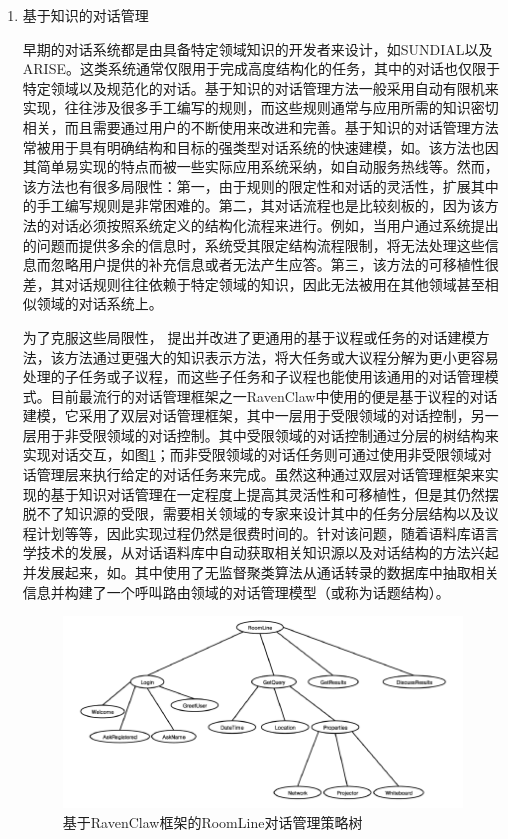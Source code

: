 \begin{enumerate}

\item 基于知识的对话管理

早期的对话系统都是由具备特定领域知识的开发者来设计，如SUNDIAL\cite{Peckham1993}以及ARISE\cite{Lamel1999}。这类系统通常仅限用于完成高度结构化的任务，其中的对话也仅限于特定领域以及规范化的对话。基于知识的对话管理方法一般采用自动有限机来实现，往往涉及很多手工编写的规则，而这些规则通常与应用所需的知识密切相关，而且需要通过用户的不断使用来改进和完善。基于知识的对话管理方法常被用于具有明确结构和目标的强类型对话系统的快速建模，如\cite{McTear1998}。该方法也因其简单易实现的特点而被一些实际应用系统采纳，如自动服务热线等。然而，该方法也有很多局限性：第一，由于规则的限定性和对话的灵活性，扩展其中的手工编写规则是非常困难的。第二，其对话流程也是比较刻板的，因为该方法的对话必须按照系统定义的结构化流程来进行。例如，当用户通过系统提出的问题而提供多余的信息时，系统受其限定结构流程限制，将无法处理这些信息而忽略用户提供的补充信息或者无法产生应答。第三，该方法的可移植性很差，其对话规则往往依赖于特定领域的知识，因此无法被用在其他领域甚至相似领域的对话系统上。

为了克服这些局限性，\cite{RichSidner1998, BohusRudnicky2003, Bui2004, LarssonTraum2006} 提出并改进了更通用的基于议程或任务的对话建模方法，该方法通过更强大的知识表示方法，将大任务或大议程分解为更小更容易处理的子任务或子议程，而这些子任务和子议程也能使用该通用的对话管理模式。目前最流行的对话管理框架之一RavenClaw\cite{BohusRudnicky2009}中使用的便是基于议程的对话建模，它采用了双层对话管理框架，其中一层用于受限领域的对话控制，另一层用于非受限领域的对话控制。其中受限领域的对话控制通过分层的树结构来实现对话交互，如图\ref{fig:knowledgeDM}；而非受限领域的对话任务则可通过使用非受限领域对话管理层来执行给定的对话任务来完成。虽然这种通过双层对话管理框架来实现的基于知识对话管理在一定程度上提高其灵活性和可移植性，但是其仍然摆脱不了知识源的受限，需要相关领域的专家来设计其中的任务分层结构以及议程计划等等，因此实现过程仍然是很费时间的。针对该问题，随着语料库语言学技术的发展，从对话语料库中自动获取相关知识源以及对话结构的方法兴起并发展起来，如\cite{RoySubramaniam2006, Bangalore2006, Lee2009a, Griol2009}。其中\cite{RoySubramaniam2006}使用了无监督聚类算法从通话转录的数据库中抽取相关信息并构建了一个呼叫路由领域的对话管理模型（或称为话题结构）。

\begin{figure}[htb]
\centering
\includegraphics[width=12cm]{figures/knowledgeDM.png}
\caption{基于RavenClaw框架的RoomLine对话管理策略树}
\label{fig:knowledgeDM}
\end{figure}



\end{enumerate}
